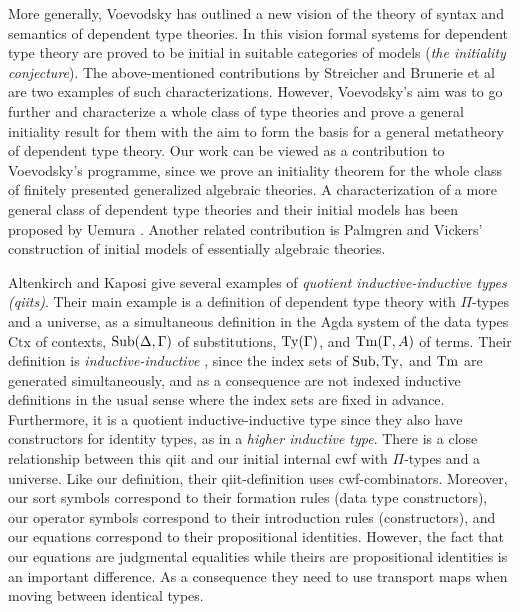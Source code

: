 \documentclass{lmcs}
\def\Ctx{\mathrm{Ctx}}
\begin{document}
More generally, Voevodsky \cite{voevodsky:initiality} has outlined a new vision of the theory of syntax and semantics of dependent type theories. In this vision formal systems for dependent type theory are proved to be initial in suitable categories of models ({\em the initiality conjecture}). The above-mentioned contributions by Streicher and Brunerie et al are two examples of such characterizations. However, Voevodsky's aim was to go further and characterize a whole class of type theories and prove a general initiality result for them with the aim to form the basis for a general metatheory of dependent type theory. Our work can be viewed as a contribution to Voevodsky's programme, since we prove an initiality theorem for the whole class of finitely presented generalized algebraic theories. A characterization of a more general class of dependent type theories and their initial models has been proposed by Uemura \cite{uemura:general-framework}. Another related contribution is Palmgren and Vickers' \cite{palmgrenvickers} construction of initial models of essentially algebraic theories.

Altenkirch and Kaposi \cite{altenkirch:qiits} give several examples of {\em quotient inductive-inductive types (qiits)}. Their main example is a definition of dependent type theory with $\Pi$-types and a universe, as a simultaneous definition in the Agda system \cite{agda-wiki} of the data types $\Ctx$ of contexts, $\mathrm{Sub}(\Delta,\Gamma)$ of substitutions, $\mathrm{Ty}(\Gamma)$, and $\mathrm{Tm}(\Gamma,A)$ of terms. Their definition is {\em inductive-inductive} \cite{nordvallforsberg:iids}, since the index sets of $\mathrm{Sub}, \mathrm{Ty},$ and $\mathrm{Tm}$ are generated simultaneously, and as a consequence are not indexed inductive definitions in the usual sense where the index sets are fixed in advance. Furthermore, it is a quotient inductive-inductive type since they also have constructors for identity types, as in a {\em higher inductive type}.
There is a close relationship between this qiit and our initial internal cwf with $\Pi$-types and a universe. Like our definition, their qiit-definition uses cwf-combinators. Moreover, our sort symbols correspond to their formation rules (data type constructors), our operator symbols correspond to their introduction rules (constructors), and our equations correspond to their propositional identities. However, the fact that our equations are judgmental equalities while theirs are propositional identities is an important difference. As a consequence they need to use transport maps when moving between identical types. 
\end{document}

